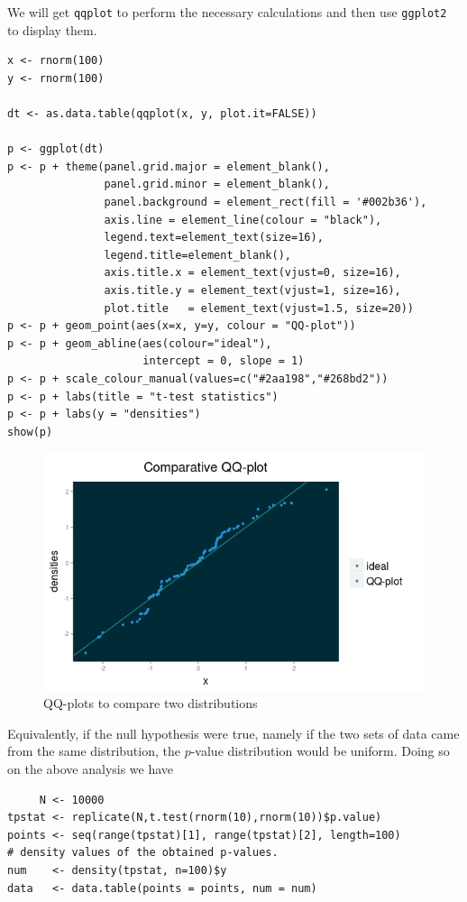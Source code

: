We will get \texttt{qqplot} to perform the necessary
calculations and then use \texttt{ggplot2} to 
display them.
\begin{verbatim}
x <- rnorm(100)
y <- rnorm(100)

dt <- as.data.table(qqplot(x, y, plot.it=FALSE))

p <- ggplot(dt)
p <- p + theme(panel.grid.major = element_blank(), 
               panel.grid.minor = element_blank(),
               panel.background = element_rect(fill = '#002b36'),
               axis.line = element_line(colour = "black"),
               legend.text=element_text(size=16),
               legend.title=element_blank(),
               axis.title.x = element_text(vjust=0, size=16),
               axis.title.y = element_text(vjust=1, size=16),
               plot.title   = element_text(vjust=1.5, size=20)) 
p <- p + geom_point(aes(x=x, y=y, colour = "QQ-plot"))
p <- p + geom_abline(aes(colour="ideal"), 
                     intercept = 0, slope = 1)
p <- p + scale_colour_manual(values=c("#2aa198","#268bd2"))
p <- p + labs(title = "t-test statistics")
p <- p + labs(y = "densities")
show(p)  
\end{verbatim}
\begin{figure}[htbp]
 \centering
 \includegraphics[scale=.6]{images/two_distr_qq}
 \caption*{QQ-plots to compare two distributions}
\end{figure}
Equivalently, if the null hypothesis were true,
namely if the two sets of data came from the 
same distribution, the $p$-value distribution
would be uniform. Doing so on the above analysis
we have
\begin{verbatim}
     N <- 10000
tpstat <- replicate(N,t.test(rnorm(10),rnorm(10))$p.value)
points <- seq(range(tpstat)[1], range(tpstat)[2], length=100)
# density values of the obtained p-values.
num    <- density(tpstat, n=100)$y
data   <- data.table(points = points, num = num)
\end{verbatim}

